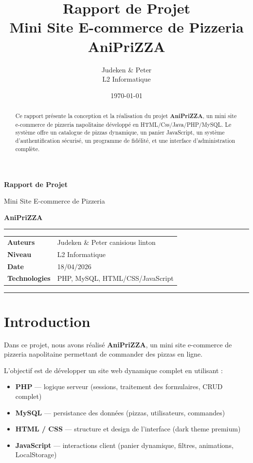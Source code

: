 \documentclass[a4paper,12pt]{article}
\title{
    \vspace{-1cm}
    {\LARGE\bfseries Rapport de Projet}\\[0.2cm]
    {\large Mini Site E-commerce de Pizzeria}\\[0.1cm]
    {\Large\textbf{\color{red!70!black}AniPriZZA}}
}
\author{Judeken \& Peter \\ L2 Informatique}
\date{\today}
\begin{document}
\begin{titlepage}
\centering
\vspace*{2cm}
{\Huge\bfseries Rapport de Projet\par}
\vspace{0.5cm}
{\LARGE Mini Site E-commerce de Pizzeria\par}
\vspace{0.3cm}
{\Huge\color{red!70!black}\bfseries AniPriZZA\par}
\vspace{1cm}
\rule{\linewidth}{0.5mm}
\vspace{0.5cm}

\begin{tabular}{ll}
\textbf{Auteurs} & Judeken \& Peter canisious linton \\
\textbf{Niveau} & L2 Informatique \\
\textbf{Date} & 18/04/2026 \\
\textbf{Technologies} & PHP, MySQL, HTML/CSS/JavaScript \\
\end{tabular}

\vspace{0.5cm}
\rule{\linewidth}{0.5mm}

\vspace{1cm}
\begin{abstract}
Ce rapport présente la conception et la réalisation du projet \textbf{AniPriZZA}, un mini site e-commerce de pizzeria napolitaine développé en HTML/Css/Java/PHP/MySQL. Le système offre un catalogue de pizzas dynamique, un panier JavaScript, un système d'authentification sécurisé, un programme de fidélité, et une interface d'administration complète.
\end{abstract}
\end{titlepage}

\tableofcontents
\newpage

\section{Introduction}

Dans ce projet, nous avons réalisé \textbf{AniPriZZA}, un mini site e-commerce de pizzeria napolitaine permettant de commander des pizzas en ligne.

L'objectif est de développer un site web dynamique complet en utilisant :
\begin{itemize}
    \item \textbf{PHP} --- logique serveur (sessions, traitement des formulaires, CRUD complet)
    \item \textbf{MySQL} --- persistance des données (pizzas, utilisateurs, commandes)
    \item \textbf{HTML / CSS} --- structure et design de l'interface (dark theme premium)
    \item \textbf{JavaScript} --- interactions client (panier dynamique, filtres, animations, LocalStorage)
\end{itemize}
\end{document}

